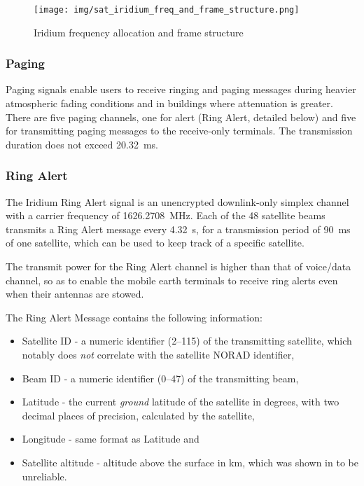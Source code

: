 \begin{figure}
    \centering
    \texttt{[image: img/sat\_iridium\_freq\_and\_frame\_structure.png]}
    \caption{Iridium frequency allocation and frame structure\cite{sop12}}
    \label{sat_iridium_freq_and_frame_structure}
\end{figure}

\subsubsection{Paging}
Paging signals enable users to receive ringing and paging messages during heavier atmospheric fading conditions and in buildings where attenuation is greater. There are five paging channels, one for alert (Ring Alert, detailed below) and five for transmitting paging messages to the receive-only terminals.  The transmission duration does not exceed \qty{20.32}{\ms}\cite{sat09}.

\subsubsection{Ring Alert}
The Iridium Ring Alert signal is an unencrypted downlink-only simplex channel with a carrier frequency of \qty{1626.2708}{\MHz}\cite{sat04}. Each of the 48 satellite beams transmits a Ring Alert message every \qty{4.32}{\s}, for a transmission period of \qty{90}{\ms} of one satellite\cite{sat07}, which can be used to keep track of a specific satellite\cite{sop11}.

The transmit power for the Ring Alert channel is higher than that of voice/data channel, so as to enable the mobile earth terminals to receive ring alerts even when their antennas are stowed\cite{sat09}.

The Ring Alert Message contains the following information\cite{sat08}:
\begin{itemize}
    \item Satellite ID - a numeric identifier (\numrange{2}{115}) of the transmitting satellite, which notably does \emph{not} correlate with the satellite NORAD identifier,
    \item Beam ID - a numeric identifier (\numrange{0}{47}) of the transmitting beam,
    \item Latitude - the current \emph{ground} latitude of the satellite in degrees, with two decimal places of precision, calculated by the satellite,
    \item Longitude - same format as Latitude and
    \item Satellite altitude - altitude above the surface in \unit{\km}, which was shown in \cite{sat08} to be unreliable.
\end{itemize}

